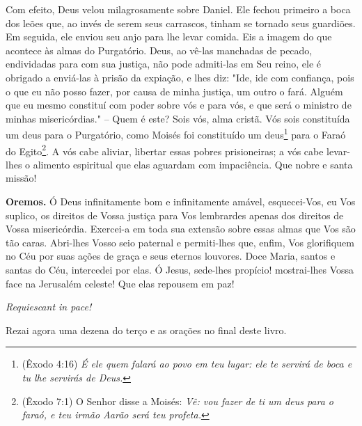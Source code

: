 Com efeito, Deus velou milagrosamente sobre Daniel. Ele fechou primeiro a boca dos leões que, ao invés de serem seus carrascos, tinham se tornado seus guardiões. Em seguida, ele enviou seu anjo para lhe levar comida. Eis a imagem do que acontece às almas do Purgatório. Deus, ao vê-las manchadas de pecado, endividadas para com sua justiça, não pode admiti-las em Seu reino, ele é obrigado a enviá-las à prisão da expiação, e lhes diz: "Ide, ide com confiança, pois o que eu não posso fazer, por causa de minha justiça, um outro o fará. Alguém que eu mesmo constituí com poder sobre vós e para vós, e que será o ministro de minhas misericórdias." – Quem é este? Sois vós, alma cristã. Vós sois constituída um deus para o Purgatório, como Moisés foi constituído um deus\footnote{(Êxodo 4:16) \textit{É ele quem falará ao povo em teu lugar: ele te servirá de boca e tu lhe servirás de Deus.}} para o Faraó do Egito\footnote{(Êxodo 7:1) O Senhor disse a Moisés: \textit{Vê: vou fazer de ti um deus para o faraó, e teu irmão Aarão será teu profeta.}}. A vós cabe aliviar, libertar essas pobres prisioneiras; a vós cabe levar-lhes o alimento espiritual que elas aguardam com impaciência. Que nobre e santa missão!


\vspace{\baselineskip}\noindent \textbf{Oremos.} Ó Deus infinitamente bom e infinitamente amável, esquecei-Vos, eu Vos suplico, os direitos de Vossa justiça para Vos lembrardes apenas dos direitos de Vossa misericórdia. Exercei-a em toda sua extensão sobre essas almas que Vos são tão caras. Abri-lhes Vosso seio paternal e permiti-lhes que, enfim, Vos glorifiquem no Céu por suas ações de graça e seus eternos louvores. Doce Maria, santos e santas do Céu, intercedei por elas. Ó Jesus, sede-lhes propício! mostrai-lhes Vossa face na Jerusalém celeste! Que elas repousem em paz!


\begin{center}
\textit{Requiescant in pace!}
\end{center}

Rezai agora uma dezena do terço e as orações no final deste livro.
